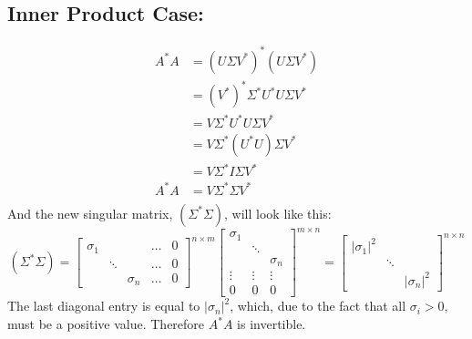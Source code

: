 \documentclass[fleqn]{article}
\begin{document}
\subsection*{Inner Product Case:}
\begin{equation*}
    \begin{split}
        A^{*}A &= (U \Sigma V^{*})^{*} (U \Sigma V^{*})\\
        &= (V^{*})^{*} \Sigma^{*} U^{*} U \Sigma V^{*}\\
        &= V \Sigma^{*} U^{*} U \Sigma V^{*}\\
        &= V \Sigma^{*} (U^{*} U) \Sigma V^{*}\\
        &= V \Sigma^{*} I \Sigma V^{*}\\
        A^{*}A &= V \Sigma^{*} \Sigma V^{*}\\
    \end{split}
\end{equation*}
And the new singular matrix, $(\Sigma^{*} \Sigma)$, will look like this: 
\begin{equation*}
    (\Sigma^{*} \Sigma) = \begin{bmatrix}\sigma_1 & & & \dots & 0\\ & \ddots & & \dots & 0 \\ & & \sigma_n & \dots & 0\end{bmatrix}^{n \times m} \begin{bmatrix}\sigma_1 \\ & \ddots \\ & & \sigma_n \\ \vdots & \vdots & \vdots \\ 0 & 0 & 0 \end{bmatrix}^{m \times n} = \begin{bmatrix}|\sigma_1|^2 \\ & \ddots \\ & & |\sigma_n|^2 \end{bmatrix}^{n \times n}
\end{equation*}
The last diagonal entry is equal to $|\sigma_n|^2$, which, due to the fact that all $\sigma_{i} > 0$, must be a positive value.  Therefore $A^{*}A$ is invertible.
\end{document}
